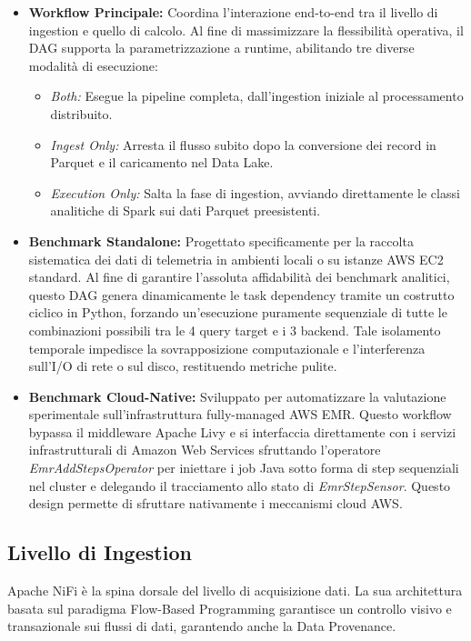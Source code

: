 \documentclass[conference]{IEEEtran}
\begin{document}
\begin{itemize}
    \item[\textbf{1)}] \textbf{Workflow Principale:} Coordina l'interazione end-to-end tra il livello di ingestion e quello di calcolo.
    Al fine di massimizzare la flessibilità operativa, il DAG supporta la parametrizzazione a runtime, abilitando tre diverse modalità di esecuzione:
    \begin{itemize}
        \item \textit{Both:} Esegue la pipeline completa, dall'ingestion iniziale al processamento distribuito.
        \item \textit{Ingest Only:} Arresta il flusso subito dopo la conversione dei record in Parquet e il caricamento nel Data Lake.
        \item \textit{Execution Only:} Salta la fase di ingestion, avviando direttamente le classi analitiche di Spark sui dati Parquet preesistenti.
    \end{itemize}
    \vspace{0.1cm}

    \item[\textbf{2)}] \textbf{Benchmark Standalone:} Progettato specificamente per la raccolta sistematica dei dati di telemetria in ambienti locali o su istanze AWS EC2 standard.
    Al fine di garantire l'assoluta affidabilità dei benchmark analitici, questo DAG genera dinamicamente le task dependency tramite un costrutto ciclico in Python, forzando un'esecuzione puramente sequenziale di tutte le combinazioni possibili tra le 4 query target e i 3 backend.
    Tale isolamento temporale impedisce la sovrapposizione computazionale e l'interferenza sull'I/O di rete o sul disco, restituendo metriche pulite.
    \vspace{0.1cm}

    \item[\textbf{3)}] \textbf{Benchmark Cloud-Native:} Sviluppato per automatizzare la valutazione sperimentale sull'infrastruttura fully-managed AWS EMR.
    Questo workflow bypassa il middleware Apache Livy e si interfaccia direttamente con i servizi infrastrutturali di Amazon Web Services sfruttando l'operatore \textit{EmrAddStepsOperator} per iniettare i job Java sotto forma di step sequenziali nel cluster e delegando il tracciamento allo stato di \textit{EmrStepSensor}.
    Questo design permette di sfruttare nativamente i meccanismi cloud AWS\@.
\end{itemize}

\subsection{Livello di Ingestion}\label{subsec:ingestion_layer}
Apache NiFi è la spina dorsale del livello di acquisizione dati.
La sua architettura basata sul paradigma Flow-Based Programming garantisce un controllo visivo e transazionale sui flussi di dati, garantendo anche la Data Provenance\@.
\end{document}
